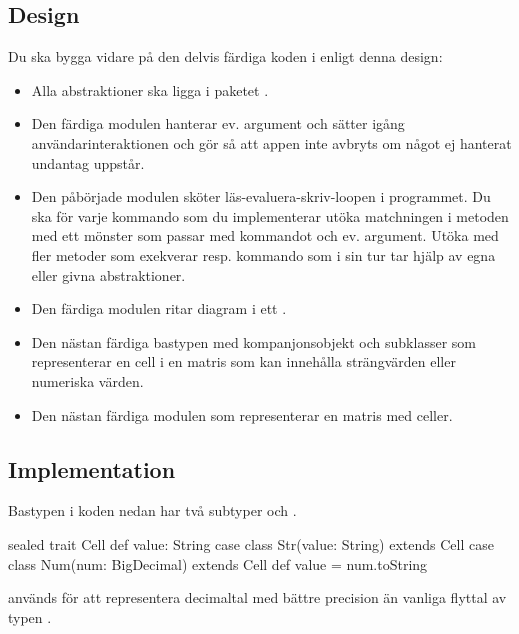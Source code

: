 \subsection{Design}

Du ska bygga vidare på den delvis färdiga koden i  enligt denna design:
\begin{itemize}

\item Alla abstraktioner ska ligga i paketet .

\item Den färdiga modulen  hanterar ev. argument och sätter igång användarinteraktionen och gör så att appen inte avbryts om något ej hanterat undantag uppstår.

\item Den påbörjade modulen  sköter läs-evaluera-skriv-loopen i programmet. Du ska för varje kommando som du implementerar utöka matchningen i metoden  med ett mönster som passar med kommandot och ev. argument. Utöka  med fler metoder som exekverar resp. kommando som i sin tur tar hjälp av egna eller givna abstraktioner.

\item Den färdiga modulen  ritar diagram i ett .

\item Den nästan färdiga bastypen  med kompanjonsobjekt och subklasser som representerar en cell i en matris som kan innehålla strängvärden eller numeriska värden. %

\item Den nästan färdiga modulen  som representerar en matris med celler. %
\end{itemize}


\subsection{Implementation}

\Task  Bastypen  i koden nedan har två subtyper  och .

\begin{CodeSmall}
sealed trait Cell { def value: String }
case class Str(value: String) extends Cell
case class Num(num: BigDecimal) extends Cell { def value = num.toString }
\end{CodeSmall}
 används för att representera decimaltal med bättre precision än vanliga flyttal av typen .

